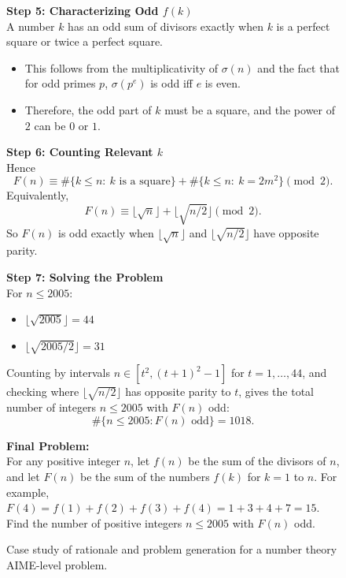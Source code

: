 \begin{figure}[ht]
{\begin{minipage}{0.99\textwidth}
            \vspace{0.5em}
            \noindent\textbf{Step 5: Characterizing Odd $f(k)$} \\
            A number $k$ has an odd sum of divisors exactly when $k$ is a perfect square or twice a perfect square.  
            \begin{itemize}
                \item This follows from the multiplicativity of $\sigma(n)$ and the fact that for odd primes $p$, $\sigma(p^e)$ is odd iff $e$ is even.  
                \item Therefore, the odd part of $k$ must be a square, and the power of $2$ can be $0$ or $1$.  
            \end{itemize}

            \vspace{0.5em}
            \noindent\textbf{Step 6: Counting Relevant $k$} \\
            Hence
            \[
            F(n) \equiv \#\{k\leq n:\ k\text{ is a square}\}+\#\{k\leq n:\ k=2m^2\}\pmod 2.
            \]
            Equivalently,
            \[
            F(n)\equiv \lfloor \sqrt{n}\rfloor + \lfloor \sqrt{n/2}\rfloor \pmod 2.
            \]
            So $F(n)$ is odd exactly when $\lfloor \sqrt{n}\rfloor$ and $\lfloor \sqrt{n/2}\rfloor$ have opposite parity.

            \vspace{0.5em}
            \noindent\textbf{Step 7: Solving the Problem} \\
            For $n\leq 2005$:  
            \begin{itemize}
                \item $\lfloor \sqrt{2005}\rfloor = 44$  
                \item $\lfloor \sqrt{2005/2}\rfloor = 31$
            \end{itemize}
            Counting by intervals $n\in[t^2,(t+1)^2-1]$ for $t=1,\dots,44$, and checking where $\lfloor \sqrt{n/2}\rfloor$ has opposite parity to $t$, gives the total number of integers $n\leq 2005$ with $F(n)$ odd:
            \[
            \#\{n\leq 2005 : F(n)\text{ odd}\} = 1018.
            \]

            \vspace{1em}
            \textbf{Final Problem:} \\
            For any positive integer $n$, let $f(n)$ be the sum of the divisors of $n$, and let $F(n)$ be the sum of the numbers $f(k)$ for $k = 1$ to $n$. For example, $F(4) = f(1) + f(2) + f(3) + f(4) = 1 + 3 + 4 + 7 = 15$. Find the number of positive integers $n \leq 2005$ with $F(n)$ odd.
        \end{minipage}%
    }
    \caption{Case study of rationale and problem generation for a number theory AIME-level problem.}
    \label{fig:case_study_rationale1}
\end{figure}



